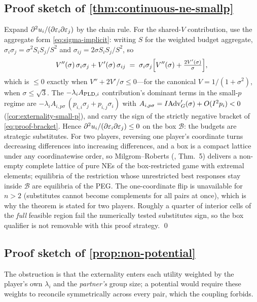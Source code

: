 \subsection{Proof sketch of \texorpdfstring{\cref{thm:continuous-ne-smallp}}{the existence theorem}}

Expand $\partial^2 u_i / (\partial \varepsilon_i \partial \varepsilon_j)$ by the
chain rule. For the shared-$V$ contribution, use the aggregate form
\eqref{eq:sigma-implicit}: writing $S$ for the weighted budget
aggregate, $\sigma_i \sigma_j = \sigma^2 S_i S_j / S^2$ and
$\sigma_{ij} = 2\sigma S_i S_j / S^2$, so
\[
V''(\sigma)\,\sigma_i\sigma_j + V'(\sigma)\,\sigma_{ij}
\;=\; \sigma_i\sigma_j\Bigl[V''(\sigma) +
\tfrac{2V'(\sigma)}{\sigma}\Bigr],
\]
which is $\leq 0$ exactly when $V'' + 2V'/\sigma \leq 0$---for the
canonical $V = 1/(1+\sigma^2)$, when $\sigma \leq \sqrt 3$. The
$-\lambda_i A_{\mathrm{PLD},i}$ contribution's dominant terms in the small-$p$ regime are
$-\lambda_i A_{i,p\sigma}\,(p_{i,i}\sigma_j + p_{i,j}\sigma_i)$ with
$A_{i,p\sigma} = I\mathrm{Adv}_G'(\sigma) + O(I^2 p_i) < 0$
(\cref{cor:externality-small-p}), and carry the sign of the strictly
negative bracket of \eqref{eq:proof-bracket}. Hence $\partial^2 u_i /
(\partial \varepsilon_i \partial \varepsilon_j) \leq 0$ on the box $\mathcal{B}$: the budgets
are strategic substitutes. For two players, reversing one player's
coordinate turns decreasing differences into increasing differences,
and a box is a compact lattice under any coordinatewise order, so
Milgrom--Roberts (\cite{milgrom1990rationalizability}, Thm.~5)
delivers a non-empty complete lattice of pure \acp{NE} of the
box-restricted game with extremal elements; equilibria of the
restriction whose unrestricted best responses stay inside $\mathcal{B}$ are
equilibria of the \ac{PEG}. The one-coordinate flip is unavailable for $n
> 2$ (substitutes cannot become complements for all pairs at once),
which is why the theorem is stated for two players. Roughly a quarter
of interior cells of the \emph{full} feasible region fail the
numerically tested substitutes sign, so the box qualifier is
not removable with this proof strategy. \qed

\subsection{Proof sketch of \texorpdfstring{\cref{prop:non-potential}}{the non-potential proposition}}

The obstruction is that the externality enters each utility weighted
by the player's own $\lambda_i$ and the \emph{partner's} group size; a
potential would require these weights to reconcile symmetrically
across every pair, which the coupling forbids.


